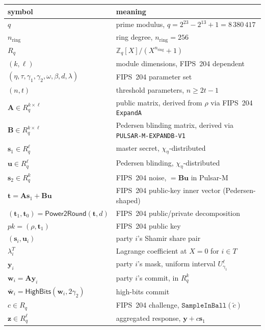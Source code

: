 \documentclass[11pt,a4paper]{article}
\theoremstyle{definition}
\theoremstyle{remark}
\newcommand{\Rq}{R_q}
\newcommand{\Zq}{\mathbb{Z}_q}
\newcommand{\HighBits}{\mathsf{HighBits}}
\newcommand{\Power}{\mathsf{Power2Round}}
\begin{document}
\begin{center}
\begin{tabular}{l l}
\toprule
symbol & meaning \\
\midrule
$q$ & prime modulus, $q = 2^{23} - 2^{13} + 1 = 8\,380\,417$ \\
$n_{\mathrm{ring}}$ & ring degree, $n_{\mathrm{ring}} = 256$ \\
$\Rq$ & $\Zq[X]/(X^{n_{\mathrm{ring}}} + 1)$ \\
$(k, \ell)$ & module dimensions, FIPS~204 dependent \\
$(\eta, \tau, \gamma_1, \gamma_2, \omega, \beta, d, \lambda)$ & FIPS~204 parameter set \\
$(n, t)$ & threshold parameters, $n \ge 2t-1$ \\
$\mathbf{A} \in \Rq^{k \times \ell}$ & public matrix, derived from $\rho$ via FIPS~204 \texttt{ExpandA} \\
$\mathbf{B} \in \Rq^{k \times \ell}$ & Pedersen blinding matrix, derived via \texttt{PULSAR-M-EXPANDB-V1} \\
$\mathbf{s}_1 \in \Rq^\ell$ & master secret, $\chi_\eta$-distributed \\
$\mathbf{u} \in \Rq^\ell$ & Pedersen blinding, $\chi_\eta$-distributed \\
$\mathbf{s}_2 \in \Rq^k$ & FIPS~204 noise, $= \mathbf{B}\mathbf{u}$ in Pulsar-M \\
$\mathbf{t} = \mathbf{A}\mathbf{s}_1 + \mathbf{B}\mathbf{u}$ & FIPS~204 public-key inner vector (Pedersen-shaped) \\
$(\mathbf{t}_1, \mathbf{t}_0) = \Power(\mathbf{t}, d)$ & FIPS~204 public/private decomposition \\
$\mathit{pk} = (\rho, \mathbf{t}_1)$ & FIPS~204 public key \\
$(\mathbf{s}_i, \mathbf{u}_i)$ & party $i$'s Shamir share pair \\
$\lambda_i^T$ & Lagrange coefficient at $X = 0$ for $i \in T$ \\
$\mathbf{y}_i$ & party $i$'s mask, uniform interval $U_{\gamma_1}^\ell$ \\
$\mathbf{w}_i = \mathbf{A}\mathbf{y}_i$ & party $i$'s commit, in $\Rq^k$ \\
$\bar{\mathbf{w}}_i = \HighBits(\mathbf{w}_i, 2\gamma_2)$ & high-bits commit \\
$c \in \Rq$ & FIPS~204 challenge, $\texttt{SampleInBall}(\tilde c)$ \\
$\mathbf{z} \in \Rq^\ell$ & aggregated response, $\mathbf{y} + c\mathbf{s}_1$ \\

\end{tabular}
\end{center}
\end{document}
